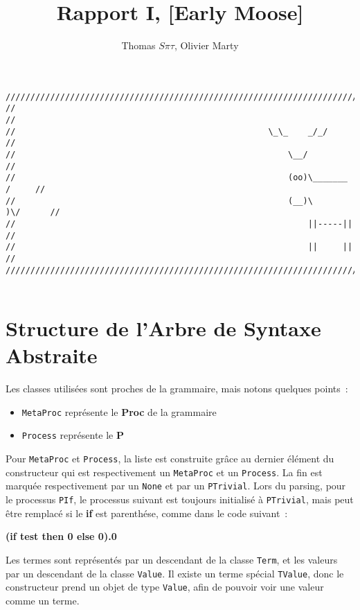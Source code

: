 \documentclass[11pt]{article} %
\title{Rapport I,  [Early Moose]}
\author{Thomas $S\pi\tau$, Olivier Marty}
\begin{document}
\maketitle

\begin{verbatim}
////////////////////////////////////////////////////////////////////////////////
//                                                                            //
//                                                   \_\_    _/_/             //
//                                                       \__/                 //
//                                                       (oo)\_______   /     //
//                                                       (__)\       )\/      //
//                                                           ||-----||        //
//                                                           ||     ||        //
////////////////////////////////////////////////////////////////////////////////  


\end{verbatim}
\section{Structure de l'Arbre de Syntaxe Abstraite}

Les classes utilisées sont proches de la grammaire, mais notons quelques points~:
\begin{itemize}
 \item  \texttt{MetaProc} représente le \textbf{Proc} de la grammaire
 \item  \texttt{Process} représente le \textbf{P}
\end{itemize}

Pour \texttt{MetaProc} et \texttt{Process}, la liste est construite grâce au dernier élément du constructeur qui est respectivement un \texttt{MetaProc} et un \texttt{Process}. La fin est marquée respectivement par un \texttt{None} et par un \texttt{PTrivial}.
Lors du parsing, pour le processus \texttt{PIf}, le processus suivant est toujours initialisé à \texttt{PTrivial}, mais peut être remplacé si le \textbf{if} est parenthése, comme dans le code suivant~:
\begin{center}
 \textbf{(if test then 0 else 0).0}
\end{center}

Les termes sont représentés par un descendant de la classe \texttt{Term}, et les valeurs par un descendant de la classe \texttt{Value}. Il existe un terme spécial \texttt{TValue}, donc le constructeur prend un objet de type \texttt{Value}, afin de pouvoir voir une valeur comme un terme.
\end{document}
